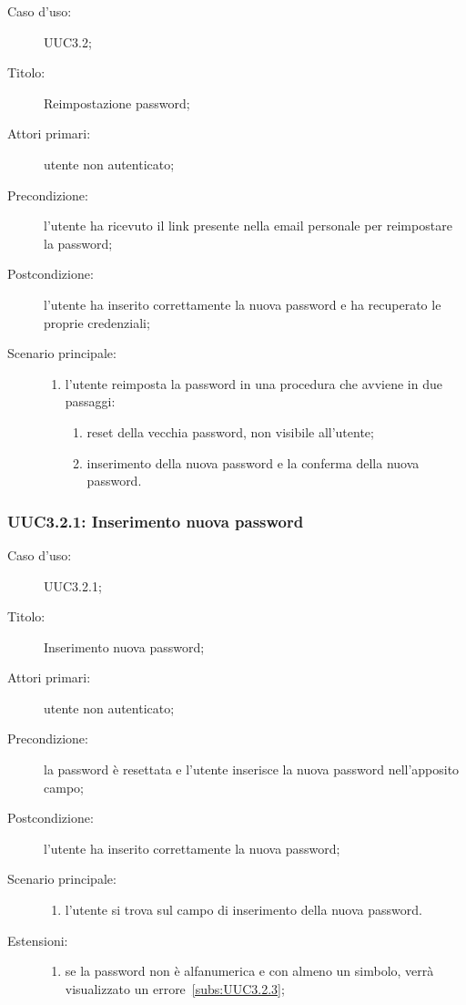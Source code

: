 \documentclass[../../../analisi-dei-requisiti.tex]{subfiles}
\begin{document}
\begin{description}
  \item[Caso d'uso:] UUC3.2;
  \item[Titolo:] Reimpostazione password;
  \item[Attori primari:] utente non autenticato;
  \item[Precondizione:] l'utente ha ricevuto il link presente nella email personale per reimpostare la password;
  \item[Postcondizione:] l'utente ha inserito correttamente la nuova password e ha recuperato le proprie credenziali;
  \item[Scenario principale:]
        \begin{enumerate}
          \item l'utente reimposta la password in una procedura che avviene in due passaggi:
                \begin{enumerate}
                  \item reset della vecchia password, non visibile all'utente;
                  \item inserimento della nuova password e la conferma della nuova password.
                \end{enumerate}
        \end{enumerate}
\end{description}

\subsubsection{UUC3.2.1: Inserimento nuova password}%
\label{subs:UUC3.2.1}
\begin{description}
  \item[Caso d'uso:] UUC3.2.1;
  \item[Titolo:] Inserimento nuova password;
  \item[Attori primari:] utente non autenticato;
  \item[Precondizione:] la password è resettata e l'utente inserisce la nuova password nell'apposito campo;
  \item[Postcondizione:] l'utente ha inserito correttamente la nuova password;
  \item[Scenario principale:]
        \begin{enumerate}
          \item l'utente si trova sul campo di inserimento della nuova password.
        \end{enumerate}
  \item[Estensioni:]
        \begin{enumerate}
          \item se la password non è alfanumerica e con almeno un simbolo, verrà visualizzato un errore~\ref{subs:UUC3.2.3};
        \end{enumerate}
\end{description}
\end{document}
